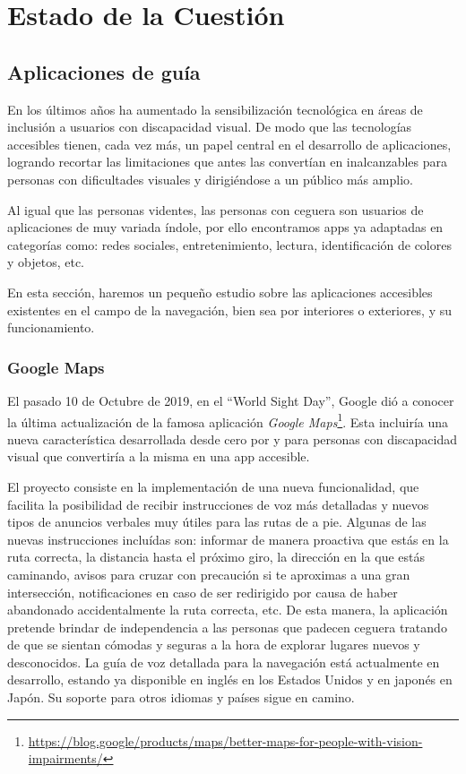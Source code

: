 \chapter{Estado de la Cuestión}
\label{cap:estadoDeLaCuestion}



\section{Aplicaciones de guía}
En los últimos años ha aumentado la sensibilización tecnológica en áreas de inclusión a usuarios con discapacidad visual. De modo que las tecnologías accesibles tienen, cada vez más, un papel central en el desarrollo de aplicaciones, logrando recortar las limitaciones que antes las convertían en inalcanzables para personas con dificultades visuales y dirigiéndose a un público más amplio.

Al igual que las personas videntes, las personas con ceguera son usuarios de aplicaciones de muy variada índole, por ello encontramos apps ya adaptadas en categorías como: redes sociales, entretenimiento, lectura, identificación de colores y objetos, etc. 

En esta sección, haremos un pequeño estudio sobre las aplicaciones accesibles existentes en el campo de la navegación, bien sea por interiores o exteriores, y su funcionamiento.
\subsection{Google Maps}
El pasado 10 de Octubre de 2019, en el ``World Sight Day'', Google dió a conocer la última actualización de la famosa aplicación \textit{Google Maps}\footnote{\url{https://blog.google/products/maps/better-maps-for-people-with-vision-impairments/}}. Esta incluiría una nueva característica desarrollada desde cero por y para personas con discapacidad visual que convertiría a la misma en una app accesible.

El proyecto consiste en la implementación de una nueva funcionalidad, que facilita la posibilidad de recibir instrucciones de voz más detalladas y nuevos tipos de anuncios verbales muy útiles para las rutas de a pie. Algunas de las nuevas instrucciones incluídas son: informar de manera proactiva que estás en la ruta correcta, la distancia hasta el próximo giro, la dirección en la que estás caminando, avisos para cruzar con precaución si te aproximas a una gran intersección, notificaciones en caso de ser redirigido por causa de haber abandonado accidentalmente la ruta correcta, etc. De esta manera, la aplicación pretende brindar de independencia a las personas que padecen ceguera tratando de que se sientan cómodas y seguras a la hora de explorar lugares nuevos y desconocidos. La guía de voz detallada para la navegación está actualmente en desarrollo, estando ya disponible en inglés en los Estados Unidos y en japonés en Japón. Su soporte para otros idiomas y países sigue en camino.

